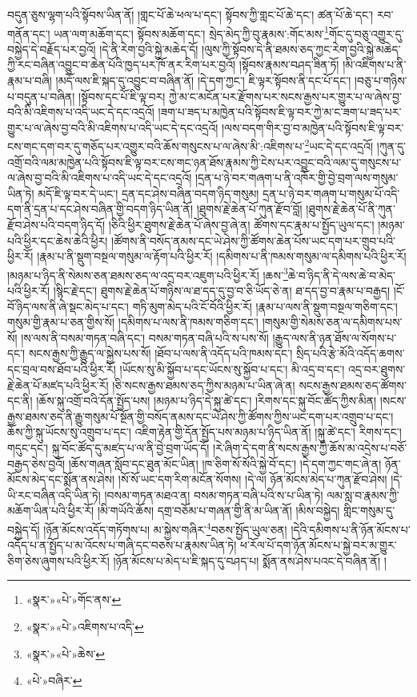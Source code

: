 བདུན་ཅུས་ལྷག་པའི་སྟོབས་ཡིན་ནོ། །གླང་པོ་ཆེ་ཕལ་པ་དང་། སྟོབས་ཀྱི་གླང་པོ་ཆེ་དང་། ཚན་པོ་ཆེ་དང་། རབ་གནོན་དང་། ཡན་ལག་མཆོག་དང་། སྟོབས་མཆོག་དང་། སྲེད་མེད་ཀྱི་བུ་རྣམས་:གོང་མས་\footnote{«སྣར་»«པེ་»གོང་ནས་}གོང་དུ་བཅུ་འགྱུར་དུ་བསྐྱེད་དེ་བརྗོད་པར་བྱའོ། །དེ་ནི་རེག་བྱའི་སྐྱེ་མཆེད་དོ། །ལུས་ཀྱི་སྟོབས་དེ་ནི་ཐམས་ཅད་ཀྱང་རེག་བྱའི་སྐྱེ་མཆེད་ཀྱི་རང་བཞིན་འབྱུང་བ་ཆེན་པོའི་ཁྱད་པར་ཁོ་ནར་རིག་པར་བྱའོ། །སྟོབས་རྣམས་བཤད་ཟིན་ཏོ། །མི་འཇིགས་པ་ནི་རྣམ་པ་བཞི། །མདོ་ལས་ཇི་སྐད་དུ་འབྱུང་བ་བཞིན་ནོ། །དེ་དག་ཀྱང་། ཇི་ལྟར་སྟོབས་ནི་དང་པོ་དང་། །བཅུ་པ་གཉིས་པ་བདུན་པ་བཞིན། །སྟོབས་དང་པོ་ཇི་ལྟ་བར། ཀྱེ་མ་ང་མངོན་པར་རྫོགས་པར་སངས་རྒྱས་པར་གྱུར་པ་ལ་ཞེས་བྱ་བའི་མི་འཇིགས་པ་འདི་ཡང་དེ་དང་འདྲའོ། །ཟག་པ་ཟད་པ་མཁྱེན་པའི་སྟོབས་ཇི་ལྟ་བར་ཀྱེ་མ་ང་ཟག་པ་ཟད་པར་གྱུར་པ་ལ་ཞེས་བྱ་བའི་མི་འཇིགས་པ་འདི་ཡང་དེ་དང་འདྲའོ། །ལས་བདག་གིར་བྱ་བ་མཁྱེན་པའི་སྟོབས་ཇི་ལྟ་བར་ངས་གང་དག་བར་དུ་གཅོད་པར་འགྱུར་བའི་ཆོས་གསུངས་པ་ལ་ཞེས་མི་:འཇིགས་པ་\footnote{«སྣར་»«པེ་»འཇིགས་པ་འདི་}ཡང་དེ་དང་འདྲའོ། །ཀུན་དུ་འགྲོ་བའི་ལམ་མཁྱེན་པའི་སྟོབས་ཇི་ལྟ་བར་ངས་གང་ཉན་ཐོས་རྣམས་ཀྱི་ངེས་པར་འབྱུང་བའི་ལམ་དུ་གསུངས་པ་ལ་ཞེས་བྱ་བའི་མི་འཇིགས་པ་འདི་ཡང་དེ་དང་འདྲའོ། །དྲན་པ་ཉེ་བར་གཞག་པ་ནི་འཁོར་གྱི་བྱེ་བྲག་ལས་གསུམ་ཡིན་ཏེ། མདོ་ཇི་ལྟ་བར་དེ་ཡང་། དྲན་དང་ཤེས་བཞིན་བདག་ཉིད་གསུམ། དྲན་པ་ཉེ་བར་གཞག་པ་གསུམ་པོ་འདི་དག་ནི་དྲན་པ་དང་ཤེས་བཞིན་གྱི་བདག་ཉིད་ཡིན་ནོ། །ཐུགས་རྗེ་ཆེན་པོ་ཀུན་རྫོབ་བློ། །ཐུགས་རྗེ་ཆེན་པོ་ནི་ཀུན་རྫོབ་ཤེས་པའི་བདག་ཉིད་དོ། །ཅིའི་ཕྱིར་ཐུགས་རྗེ་ཆེན་པོ་ཞེས་བྱ་ཞེ་ན། ཚོགས་དང་རྣམ་པ་སྤྱོད་ཡུལ་དང་། །མཉམ་པའི་ཕྱིར་དང་ཆེས་ཆེའི་ཕྱིར། །ཚོགས་ནི་བསོད་ནམས་དང་ཡེ་ཤེས་ཀྱི་ཚོགས་ཆེན་པོས་ཡང་དག་པར་གྲུབ་པའི་ཕྱིར་རོ། །རྣམ་པ་ནི་སྡུག་བསྔལ་གསུམ་ལ་རྟོག་པའི་ཕྱིར་རོ། །དམིགས་པ་ནི་ཁམས་གསུམ་ལ་དམིགས་པའི་ཕྱིར་རོ། །མཉམ་པ་ཉིད་ནི་སེམས་ཅན་ཐམས་ཅད་ལ་འདྲ་བར་འཇུག་པའི་ཕྱིར་རོ། །ཆས་\footnote{«སྣར་»«པེ་»ཆེས་}ཆེ་བ་ཉིད་ནི་དེ་ལས་ཆེ་བ་མེད་པའི་ཕྱིར་རོ། །སྙིང་རྗེ་དང་། ཐུགས་རྗེ་ཆེན་པོ་གཉིས་ལ་ཐ་དད་དུ་བྱ་བ་ཅི་ཡོད་ཅེ་ན། ཐ་དད་བྱ་བ་རྣམ་པ་བརྒྱད། །ངོ་བོ་ཉིད་ལས་ནི་ཞེ་སྡང་མེད་པ་དང་། གཏི་མུག་མེད་པའི་ངོ་བོའི་ཕྱིར་རོ། །རྣམ་པ་ལས་ནི་སྡུག་བསྔལ་གཅིག་དང་། གསུམ་གྱི་རྣམ་པ་ཅན་གྱིས་སོ། །དམིགས་པ་ལས་ནི་ཁམས་གཅིག་དང་། །གསུམ་གྱི་སེམས་ཅན་ལ་དམིགས་པས་སོ། །ས་ལས་ནི་བསམ་གཏན་བཞི་དང་། བསམ་གཏན་བཞི་པའི་ས་པས་སོ། །རྒྱུད་ལས་ནི་ཉན་ཐོས་ལ་སོགས་པ་དང་། སངས་རྒྱས་ཀྱི་རྒྱུད་ལ་སྐྱེས་པས་སོ། །ཐོབ་པ་ལས་ནི་འདོད་པའི་ཁམས་དང་། སྲིད་པའི་རྩེ་མོའི་འདོད་ཆགས་དང་བྲལ་བས་ཐོབ་པའི་ཕྱིར་རོ། །ཡོངས་སུ་མི་སྐྱོབ་པ་དང་ཡོངས་སུ་སྐྱོབ་པ་དང་། མི་འདྲ་བ་དང་། འདྲ་བར་ཐུགས་རྗེ་ཆེན་པོ་མཛད་པའི་ཕྱིར་རོ། །ཅི་སངས་རྒྱས་ཐམས་ཅད་ཀྱིས་མཉམ་པ་ཡིན་ཞེ་ན། སངས་རྒྱས་ཐམས་ཅད་ཚོགས་དང་ནི། །ཆོས་སྐུ་འགྲོ་བའི་དོན་སྤྱོད་པས། །མཉམ་པ་ཉིད་དེ་སྐུ་ཚེ་དང་། །རིགས་དང་སྐུ་བོང་ཚོད་ཀྱིས་མིན། །སངས་རྒྱས་ཐམས་ཅད་ནི་རྒྱུ་གསུམ་པོ་སྔོན་གྱི་བསོད་ནམས་དང་ཡེ་ཤེས་ཀྱི་ཚོགས་ཀྱིས་ཡང་དག་པར་འགྲུབ་པ་དང་། ཆོས་ཀྱི་སྐུ་ཡོངས་སུ་འགྲུབ་པ་དང་། འཇིག་རྟེན་གྱི་དོན་སྤྱོད་པས་མཉམ་པ་ཉིད་ཡིན་ནོ། །སྐུ་ཚེ་དང་། རིགས་དང་། གདུང་དང་། སྐུ་བོང་ཚོད་དུ་མཛད་པ་ལ་ནི་བྱེ་བྲག་ཡོད་དོ། །རེ་ཞིག་དེ་དག་ནི་སངས་རྒྱས་ཀྱི་ཆོས་མ་འདྲེས་པ་བཅོ་བརྒྱད་ཅེས་བྱའོ། །ཆོས་གཞན་སློབ་དང་ཐུན་མོང་ཡིན། །ཁ་ཅིག་སོ་སོའི་སྐྱེ་བོ་དང་། །དེ་དག་ཀྱང་གང་ཞེ་ན། ཉོན་མོངས་མེད་དང་སྨོན་ནས་ཤེས། །སོ་སོ་ཡང་དག་རིག་མངོན་སོགས། །དེ་ལ། ཉོན་མོངས་མེད་པ་ཀུན་རྫོབ་ཤེས། །དེ་ཡི་རང་བཞིན་འདི་ཡིན་ཏེ། །བསམ་གཏན་མཐའ་ན། བསམ་གཏན་བཞི་པའི་ས་པ་ཡིན་ཏེ། ལམ་སླ་བ་རྣམས་ཀྱི་མཆོག་ཡིན་པའི་ཕྱིར་རོ། །མི་གཡོའི་ཆོས། དགྲ་བཅོམ་པ་གཞན་གྱི་ནི་མ་ཡིན་ནོ། །མིས་བསྐྱེད། གླིང་གསུམ་དུ་བསྐྱེད་དོ། །ཉོན་མོངས་འདོད་གཏོགས་པ། མ་སྐྱེས་གཞིར་\footnote{«པེ་»བཞིར་}བཅས་སྤྱོད་ཡུལ་ཅན། །དེའི་དམིགས་པ་ནི་ཉོན་མོངས་པ་འདོད་པ་ན་སྤྱོད་པ་མ་འོངས་པ་གཞི་དང་བཅས་པ་རྣམས་ཡིན་ཏེ། ཕ་རོལ་པོ་དག་ཉོན་མོངས་པ་སྐྱེ་བར་མ་གྱུར་ཅིག་ཅེས་ཞུགས་པའི་ཕྱིར་རོ། །ཉོན་མོངས་པ་མེད་པ་ཇི་སྐད་དུ་བཤད་པ། སྨོན་ནས་ཤེས་པའང་དེ་བཞིན་ནོ། །
